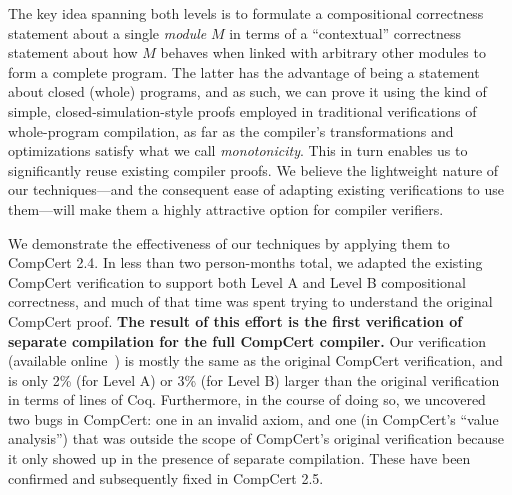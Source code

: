 The key idea spanning both levels is to formulate a compositional correctness statement about a
single \emph{module} $M$ in terms of a ``contextual'' correctness statement about how $M$ behaves
when linked with arbitrary other modules to form a complete program.  The latter has the advantage
of being a statement about closed (whole) programs, and as such, we can prove it using the kind of
simple, closed-simulation-style proofs employed in traditional verifications of whole-program
compilation, as far as the compiler's transformations and optimizations satisfy what we call
\emph{monotonicity}.  This in turn enables us to significantly reuse existing compiler proofs.  We
believe the lightweight nature of our techniques---and the consequent ease of adapting existing
verifications to use them---will make them a highly attractive option for compiler verifiers.

We demonstrate the effectiveness of our techniques by applying them to CompCert 2.4.  In less than
two person-months total, we adapted the existing CompCert verification to support both Level A and
Level B compositional correctness, and much of that time was spent trying to understand the original
CompCert proof.  \textbf{The result of this effort is the first verification of separate compilation
  for the full CompCert compiler.}  Our verification (available online~\cite{kang-phd-thesis-web})
is mostly the same as the original CompCert verification, and is only 2\% (for Level A) or 3\% (for
Level B) larger than the original verification in terms of lines of Coq.  Furthermore, in the course
of doing so, we uncovered two bugs in CompCert: one in an invalid axiom, and one (in CompCert's
``value analysis'') that was outside the scope of CompCert's original verification because it only
showed up in the presence of separate compilation.  These have been confirmed and subsequently fixed
in CompCert 2.5.




